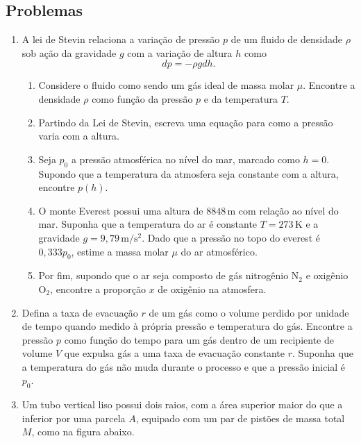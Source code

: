 \documentclass[a4paper, 12pt]{article}
\theoremstyle{definition}
\theoremstyle{definition}
\begin{document}
\subsection{Problemas}
\begin{enumerate}
    \item A lei de Stevin relaciona a variação de pressão $p$ de um fluido de densidade $\rho$ sob ação da
    gravidade $g$ com a variação de altura $h$ como
    $$dp=-\rho gdh.$$
    \begin{enumerate}
        \item Considere o fluido como sendo um gás ideal de massa molar $\mu$. Encontre a densidade $\rho$
        como função da pressão $p$ e da temperatura $T$.
        \item Partindo da Lei de Stevin, escreva uma equação para como a pressão varia com a altura.
        \item Seja $p_0$ a pressão atmosférica no nível do mar, marcado como $h=0$. Supondo que a temperatura
        da atmosfera seja constante com a altura, encontre $p(h)$.
        \item O monte Everest possui uma altura de $8848\,\mathrm{m}$ com relação ao nível do mar. Suponha que
        a temperatura do ar é constante $T=273\,\mathrm{K}$ e a gravidade $g=9{,}79\,\mathrm{m/s^2}$. Dado
        que a pressão no topo do everest é $0{,}333p_0$, estime a massa molar $\mu$ do ar atmosférico.
        \item Por fim, supondo que o ar seja composto de gás nitrogênio $\mathrm{N_2}$ e oxigênio $\mathrm{O_2}$,
        encontre a proporção $x$ de oxigênio na atmosfera.
    \end{enumerate}
    \item Defina a taxa de evacuação $r$ de um gás como o volume perdido por unidade de tempo quando medido à
    própria pressão e temperatura do gás. Encontre a pressão $p$ como função do tempo para um gás dentro
    de um recipiente de volume $V$ que expulsa gás a uma taxa de evacuação constante $r$. Suponha que a
    temperatura do gás não muda durante o processo e que a pressão inicial é $p_0$.
    \item Um tubo vertical liso possui dois raios, com a área superior maior do que a inferior por uma parcela
    $A$, equipado com um par de pistões de massa total $M$, como na figura abaixo.
    \begin{figure}[h]
        \centering
\end{figure}
\end{enumerate}
\end{document}
